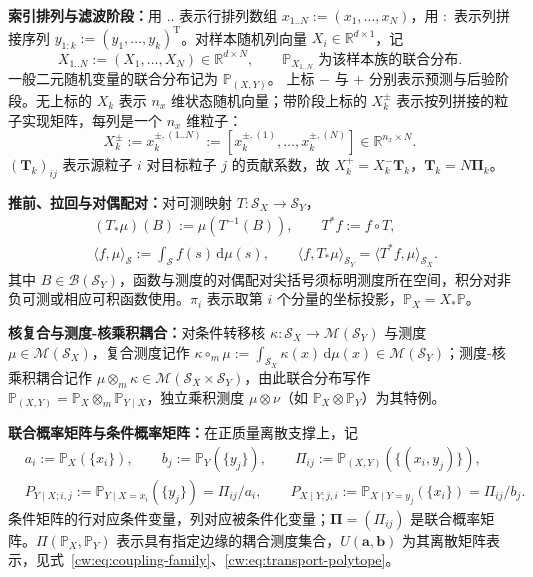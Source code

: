 \textbf{索引排列与滤波阶段：}用 $..$ 表示行排列数组 $x_{1..N}:=(x_1,\dots,x_N)$，用 $:$ 表示列拼接序列 $y_{1:k}:=(y_1,\dots,y_k)^{\mathrm T}$。对样本随机列向量 $X_i\in\mathbb R^{d\times1}$，记
\begin{equation*}
X_{1..N}:=(X_1,\dots,X_N)\in\mathbb R^{d\times N},\qquad
\mathbb P_{X_{1..N}}\text{ 为该样本族的联合分布}.
\end{equation*}
一般二元随机变量的联合分布记为 $\mathbb P_{(X,Y)}$。
上标 $-$ 与 $+$ 分别表示预测与后验阶段。无上标的 $X_k$ 表示 $n_x$ 维状态随机向量；带阶段上标的 $X_k^\pm$ 表示按列拼接的粒子实现矩阵，每列是一个 $n_x$ 维粒子：
\begin{equation*}
X_k^\pm:=x_k^{\pm,(1..N)}:=[x_k^{\pm,(1)},\dots,x_k^{\pm,(N)}]\in\mathbb R^{n_x\times N}.
\end{equation*}
$(\bm T_k)_{ij}$ 表示源粒子 $i$ 对目标粒子 $j$ 的贡献系数，故 $X_k^+=X_k^-\bm T_k$，$\bm T_k=N\bm\Pi_k$。

\textbf{推前、拉回与对偶配对：}对可测映射 $T:\mathcal S_X\to\mathcal S_Y$，
\begin{equation*}
\begin{aligned}
&(T_*\mu)(B):=\mu(T^{-1}(B)),\qquad T^*f:=f\circ T,\\
&\langle f,\mu\rangle_{\mathcal S}:=\int_{\mathcal S}f(s)\,\mathrm d\mu(s),\qquad
\langle f,T_*\mu\rangle_{\mathcal S_Y}=\langle T^*f,\mu\rangle_{\mathcal S_X}.
\end{aligned}
\end{equation*}
其中 $B\in\mathcal B(\mathcal S_Y)$，函数与测度的对偶配对尖括号须标明测度所在空间，积分对非负可测或相应可积函数使用。$\pi_i$ 表示取第 $i$ 个分量的坐标投影，$\mathbb P_X=X_*\mathbb P$。

\textbf{核复合与测度-核乘积耦合：}对条件转移核 $\kappa:\mathcal S_X\to\mathcal M(\mathcal S_Y)$ 与测度 $\mu\in\mathcal M(\mathcal S_X)$，复合测度记作 $\kappa\circ_m\mu:=\int_{\mathcal S_X}\kappa(x)\,\mathrm d\mu(x)\in\mathcal M(\mathcal S_Y)$；测度-核乘积耦合记作 $\mu\otimes_m\kappa\in\mathcal M(\mathcal S_X\times\mathcal S_Y)$，由此联合分布写作 $\mathbb P_{(X,Y)}=\mathbb P_X\otimes_m\mathbb P_{Y\mid X}$，独立乘积测度 $\mu\otimes\nu$（如 $\mathbb P_X\otimes\mathbb P_Y$）为其特例。

\textbf{联合概率矩阵与条件概率矩阵：}在正质量离散支撑上，记
\begin{equation*}
\begin{aligned}
&a_i:=\mathbb P_X(\{x_i\}),\qquad b_j:=\mathbb P_Y(\{y_j\}),\qquad
\Pi_{ij}:=\mathbb P_{(X,Y)}(\{(x_i,y_j)\}),\\
&P_{Y\mid X;i,j}:=\mathbb P_{Y\mid X=x_i}(\{y_j\})=\Pi_{ij}/a_i,\qquad
P_{X\mid Y;j,i}:=\mathbb P_{X\mid Y=y_j}(\{x_i\})=\Pi_{ij}/b_j.
\end{aligned}
\end{equation*}
条件矩阵的行对应条件变量，列对应被条件化变量；$\bm\Pi=(\Pi_{ij})$ 是联合概率矩阵。$\Pi(\mathbb P_X,\mathbb P_Y)$ 表示具有指定边缘的耦合测度集合，$U(\bm a,\bm b)$ 为其离散矩阵表示，见式~\eqref{cw:eq:coupling-family}、\eqref{cw:eq:transport-polytope}。

